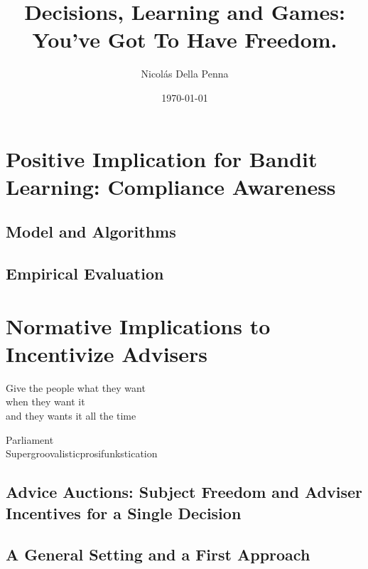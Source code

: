 \documentclass[11pt, a4paper]{book}
\title{Decisions, Learning and Games: \\ You've Got To Have Freedom.}
\author{Nicol\'as Della Penna}
\date{\today}
\begin{document}
\pagestyle{empty}
\thispagestyle{empty}



\cleardoublepage
\pagestyle{empty}


\cleardoublepage
\pagestyle{empty}


\cleardoublepage
\pagestyle{headings}


\cleardoublepage
\pagestyle{headings}
\tableofcontents
\listoffigures
\listoftables

\mainmatter




\part{Positive Implication for Bandit Learning: Compliance Awareness}

\chapter{Model and Algorithms} \label{cha:bandit}





\chapter{Empirical Evaluation} \label{cha:empirical}



\part{Normative Implications to Incentivize Advisers}


\epigraph{Give the people what they want\\ when they want it \\
and they wants it all the time}{Parliament \\ Supergroovalisticprosifunkstication}

\chapter{Advice Auctions: Subject Freedom and Adviser Incentives for a Single Decision} \label{cha:market}


\chapter{A General Setting and a First Approach} \label{cha:twosided}

\end{document}
